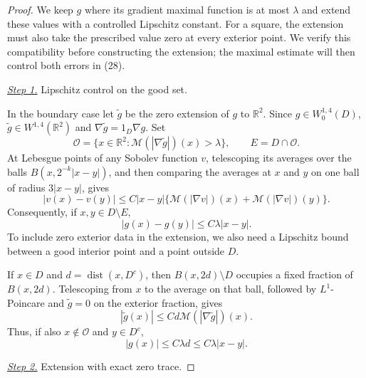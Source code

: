 \documentclass{aomart}
\theoremstyle{definition}
\newcommand{\1}{\mathbf 1}
\begin{document}
\begin{proof}
We keep $g$ where its gradient maximal function is at most $\lambda$
and extend these values with a controlled Lipschitz constant.  For a
square, the extension must also take the prescribed value zero at every
exterior point.  We verify this compatibility before constructing the
extension; the maximal estimate will then control both errors in (28).

\smallskip\noindent
\underline{\textit{Step 1.}} Lipschitz control on the good set.

In the boundary case let $\widetilde g$ be the zero extension of $g$
to $\mathbb R^2$.  Since $g\in W^{1,4}_ 0(D)$,
$\widetilde g\in W^{1,4}(\mathbb R^2)$ and
$\nabla\widetilde g=1_ D\nabla g$.  Set
\begin{equation*}
\mathcal O=\{x\in\mathbb R^2:
\mathcal M(|\nabla\widetilde g|)(x)>\lambda\},\qquad
E=D\cap\mathcal O.
\end{equation*}
At Lebesgue points of any Sobolev function $v$, telescoping its averages
over the balls $B(x,2^{-k}|x-y|)$, and then comparing the averages at
$x$ and $y$ on one ball of radius $3|x-y|$, gives
\begin{equation*}
|v(x)-v(y)|\leq C|x-y|
\{\mathcal M(|\nabla v|)(x)+\mathcal M(|\nabla v|)(y)\}.
\end{equation*}
Consequently, if $x,y\in D\setminus E$,
\begin{equation}
|g(x)-g(y)|\leq C\lambda|x-y|.
\tag{28a}
\end{equation}
To include zero exterior data in the extension, we also need a
Lipschitz bound between a good interior point and a point outside $D$.

If $x\in D$ and $d=\operatorname {dist}(x,D^c)$, then
$B(x,2d)\setminus D$ occupies a fixed fraction of $B(x,2d)$.
Telescoping from $x$ to the average on that ball, followed by
$L^1$-Poincare and $\widetilde g=0$ on the exterior fraction, gives
\begin{equation*}
|\widetilde g(x)|\leq Cd\mathcal M(|\nabla\widetilde g|)(x).
\end{equation*}
Thus, if also $x\notin\mathcal O$ and $y\in D^c$,
\begin{equation}
|g(x)|\leq C\lambda d\leq C\lambda|x-y|.
\tag{28b}
\end{equation}

\smallskip\noindent
\underline{\textit{Step 2.}} Extension with exact zero trace.


\end{proof}
\end{document}
